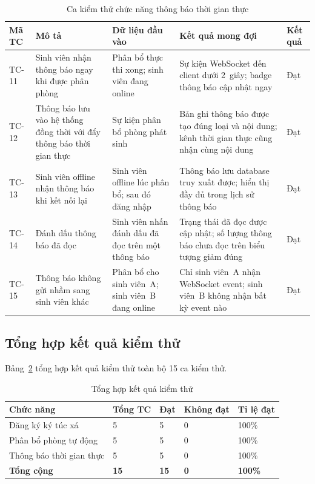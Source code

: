\documentclass[../DoAn.tex]{subfiles}
\begin{document}
\vspace{-6pt}
\begin{table}[H]
\centering
\caption{Ca kiểm thử chức năng thông báo thời gian thực}
\label{tab:tc_notification}
\small
\begin{tabular}{|p{1.0cm}|p{2.6cm}|p{3.2cm}|p{3.8cm}|p{1.4cm}|}
\hline
\textbf{Mã TC} & \textbf{Mô tả} & \textbf{Dữ liệu đầu vào} & \textbf{Kết quả mong đợi} & \textbf{Kết quả} \\
\hline
TC-11 & Sinh viên nhận thông báo ngay khi được phân phòng & Phân bổ thực thi xong; sinh viên đang online & Sự kiện WebSocket đến client dưới 2~giây; badge thông báo cập nhật ngay & Đạt \\
\hline
TC-12 & Thông báo lưu vào hệ thống đồng thời với đẩy thông báo thời gian thực & Sự kiện phân bổ phòng phát sinh & Bản ghi thông báo được tạo đúng loại và nội dung; kênh thời gian thực cũng nhận cùng nội dung & Đạt \\
\hline
TC-13 & Sinh viên offline nhận thông báo khi kết nối lại & Sinh viên offline lúc phân bổ; sau đó đăng nhập & Thông báo lưu database truy xuất được; hiển thị đầy đủ trong lịch sử thông báo & Đạt \\
\hline
TC-14 & Đánh dấu thông báo đã đọc & Sinh viên nhấn đánh dấu đã đọc trên một thông báo & Trạng thái đã đọc được cập nhật; số lượng thông báo chưa đọc trên biểu tượng giảm đúng & Đạt \\ \hline
TC-15 & Thông báo không gửi nhầm sang sinh viên khác & Phân bổ cho sinh viên~A; sinh viên~B đang online & Chỉ sinh viên~A nhận WebSocket event; sinh viên~B không nhận bất kỳ event nào & Đạt \\
\hline
\end{tabular}
\end{table}
\vspace{-4pt}

\subsection*{Tổng hợp kết quả kiểm thử}

Bảng~\ref{tab:test_summary} tổng hợp kết quả kiểm thử toàn bộ 15 ca kiểm thử.

\begin{table}[H]
\centering
\caption{Tổng hợp kết quả kiểm thử}
\label{tab:test_summary}
\small
\begin{tabular}{|p{5.4cm}|p{2.0cm}|p{1.8cm}|p{2.2cm}|p{1.8cm}|}
\hline
\textbf{Chức năng} & \textbf{Tổng TC} & \textbf{Đạt} & \textbf{Không đạt} & \textbf{Tỉ lệ đạt} \\
\hline
Đăng ký ký túc xá & 5 & 5 & 0 & 100\% \\
\hline
Phân bổ phòng tự động & 5 & 5 & 0 & 100\% \\
\hline
Thông báo thời gian thực & 5 & 5 & 0 & 100\% \\
\hline
\textbf{Tổng cộng} & \textbf{15} & \textbf{15} & \textbf{0} & \textbf{100\%} \\
\hline
\end{tabular}
\end{table}
\end{document}
